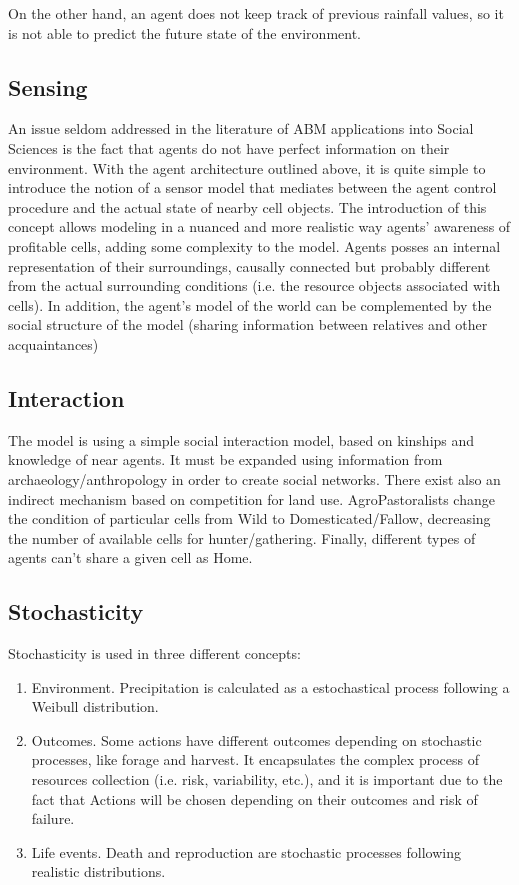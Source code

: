 On the other hand, an agent does not keep track of previous rainfall values, so it is not able to predict
the future state of the environment.

\subsection{Sensing}
An issue seldom addressed in the literature of ABM applications into Social Sciences is the fact that
agents do not have perfect information on their environment.
With the agent architecture outlined above, it is quite simple to introduce the notion of a sensor model
that mediates between the agent control procedure and the actual state of nearby cell objects. The
introduction of this concept allows modeling in a nuanced and more realistic way agents’ awareness of
profitable cells, adding some complexity to the model. Agents posses an internal representation of
their surroundings, causally connected but probably different from the actual surrounding conditions
(i.e. the resource objects associated with cells). In addition, the agent's model of the world can be
complemented by the social structure of the model (sharing information between relatives and other
acquaintances)

\subsection{Interaction}
The model is using a simple social interaction model, based on kinships and knowledge of near
agents. It must be expanded using information from archaeology/anthropology in order to create social
networks.
There exist also an indirect mechanism based on competition for land use. AgroPastoralists change
the condition of particular cells from Wild to Domesticated/Fallow, decreasing the number of available
cells for hunter/gathering. Finally, different types of agents can't share a given cell as Home.

\subsection{Stochasticity}
Stochasticity is used in three different concepts:
\begin{enumerate}
\item Environment. Precipitation is calculated as a estochastical process following a Weibull
distribution.
\item Outcomes. Some actions have different outcomes depending on stochastic processes,
like forage and harvest. It encapsulates the complex process of resources collection (i.e.
risk, variability, etc.), and it is important due to the fact that Actions will be chosen
depending on their outcomes and risk of failure.
\item Life events. Death and reproduction are stochastic processes following realistic
distributions.
\end{enumerate}

